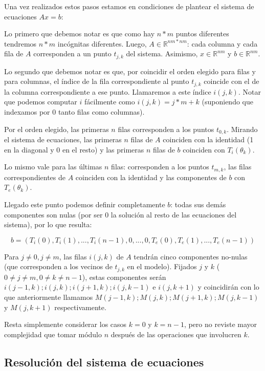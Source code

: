 Una vez realizados estos pasos estamos en condiciones de plantear el sistema de ecuaciones $Ax=b$:

Lo primero que debemos notar es que como hay $n*m$ puntos diferentes tendremos $n*m$ incógnitas diferentes. Luego, $A \in \mathbb{R}^{nm*nm}$: cada columna y cada fila de $A$ corresponden a un punto $t_{j,k}$ del sistema. Asimismo, $x \in \mathbb{R}^{nm}$ y $b \in \mathbb{R}^{nm}$. 

Lo segundo que debemos notar es que, por coincidir el orden elegido para filas y para columnas, el índice de la fila correspondiente al punto $t_{j,k}$ coincide con el de la columna correspondiente a ese punto. Llamaremos a este índice $i(j,k)$. Notar que podemos computar $i$ fácilmente como $i(j,k)=j*m+k$ (suponiendo que indexamos por 0 tanto filas como columnas).

Por el orden elegido, las primeras $n$ filas corresponden a los puntos $t_{0,k}$. Mirando el sistema de ecuaciones, las primeras $n$ filas de $A$ coinciden con la identidad (1 en la diagonal y 0 en el resto) y las primeras $n$ filas de $b$ coinciden con $T_i(\theta_k)$.

Lo mismo vale para las últimas $n$ filas: corresponden a los puntos $t_{m,k}$, las filas correspondientes de $A$ coinciden con la identidad y las componentes de $b$ con $T_e(\theta_k)$.

Llegado este punto podemos definir completamente $b$: todas sus demás componentes son nulas (por ser $0$ la solución al resto de las ecuaciones del sistema), por lo que resulta:

$$b = (T_i(0), T_i(1), ..., T_i(n-1), 0, ..., 0, T_e(0), T_e(1), ..., T_e(n-1)) $$

Para $j \not = 0, j \not = m$, las filas $i(j,k)$ de $A$ tendrán cinco componentes no-nulas (que corresponden a los vecinos de $t_{j,k}$ en el modelo). Fijados $j$ y $k$ ($0\not=j\not=m, 0\not=k\not=n-1$), estas componentes serán $i(j-1,k); i(j,k); i(j+1,k); i(j,k-1)$ e $i(j,k+1)$ y coincidirán con lo que anteriormente llamamos $M(j-1,k); M(j,k); M(j+1,k); M(j,k-1)$ y $M(j,k+1)$ respectivamente. 

Resta simplemente considerar los casos $k=0$ y $k=n-1$, pero no reviste mayor complejidad que tomar módulo $n$ después de las operaciones que involucren $k$.

\subsection{Resolución del sistema de ecuaciones}
